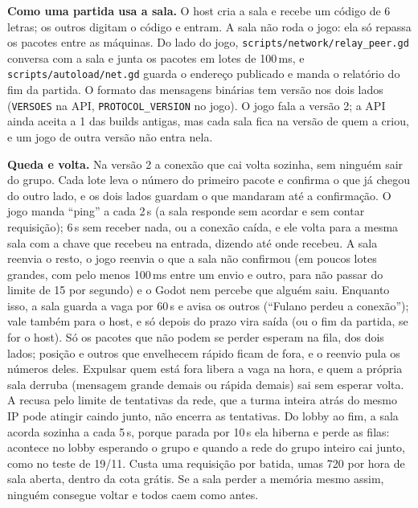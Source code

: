 \documentclass[11pt,a4paper]{article}
\begin{document}
\textbf{Como uma partida usa a sala.} O host cria a sala e recebe um código de 6 letras; os outros digitam o código e entram. A sala não roda o jogo: ela só repassa os pacotes entre as máquinas. Do lado do jogo, \texttt{scripts/network/relay\_peer.gd} conversa com a sala e junta os pacotes em lotes de 100\,ms, e \texttt{scripts/autoload/net.gd} guarda o endereço publicado e manda o relatório do fim da partida. O formato das mensagens binárias tem versão nos dois lados (\texttt{VERSOES} na API, \texttt{PROTOCOL\_VERSION} no jogo). O jogo fala a versão 2; a API ainda aceita a 1 das builds antigas, mas cada sala fica na versão de quem a criou, e um jogo de outra versão não entra nela.

\textbf{Queda e volta.} Na versão 2 a conexão que cai volta sozinha, sem ninguém sair do grupo. Cada lote leva o número do primeiro pacote e confirma o que já chegou do outro lado, e os dois lados guardam o que mandaram até a confirmação. O jogo manda ``ping'' a cada 2\,s (a sala responde sem acordar e sem contar requisição); 6\,s sem receber nada, ou a conexão caída, e ele volta para a mesma sala com a chave que recebeu na entrada, dizendo até onde recebeu. A sala reenvia o resto, o jogo reenvia o que a sala não confirmou (em poucos lotes grandes, com pelo menos 100\,ms entre um envio e outro, para não passar do limite de 15 por segundo) e o Godot nem percebe que alguém saiu. Enquanto isso, a sala guarda a vaga por 60\,s e avisa os outros (``Fulano perdeu a conexão''); vale também para o host, e só depois do prazo vira saída (ou o fim da partida, se for o host). Só os pacotes que não podem se perder esperam na fila, dos dois lados; posição e outros que envelhecem rápido ficam de fora, e o reenvio pula os números deles. Expulsar quem está fora libera a vaga na hora, e quem a própria sala derruba (mensagem grande demais ou rápida demais) sai sem esperar volta. A recusa pelo limite de tentativas da rede, que a turma inteira atrás do mesmo IP pode atingir caindo junto, não encerra as tentativas. Do lobby ao fim, a sala acorda sozinha a cada 5\,s, porque parada por 10\,s ela hiberna e perde as filas: acontece no lobby esperando o grupo e quando a rede do grupo inteiro cai junto, como no teste de 19/11. Custa uma requisição por batida, umas 720 por hora de sala aberta, dentro da cota grátis. Se a sala perder a memória mesmo assim, ninguém consegue voltar e todos caem como antes.
\end{document}
